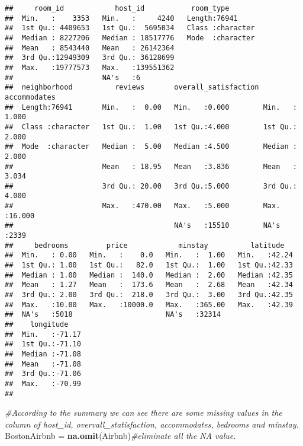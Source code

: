 \documentclass[]{article}
\newenvironment{Shaded}{\begin{snugshade}}{\end{snugshade}}
\newcommand{\KeywordTok}[1]{\textcolor[rgb]{0.13,0.29,0.53}{\textbf{#1}}}
\newcommand{\StringTok}[1]{\textcolor[rgb]{0.31,0.60,0.02}{#1}}
\newcommand{\CommentTok}[1]{\textcolor[rgb]{0.56,0.35,0.01}{\textit{#1}}}
\newcommand{\NormalTok}[1]{#1}
\begin{document}
\begin{verbatim}
##     room_id            host_id           room_type        
##  Min.   :    3353   Min.   :     4240   Length:76941      
##  1st Qu.: 4409653   1st Qu.:  5695034   Class :character  
##  Median : 8227206   Median : 18517776   Mode  :character  
##  Mean   : 8543440   Mean   : 26142364                     
##  3rd Qu.:12949309   3rd Qu.: 36128699                     
##  Max.   :19777573   Max.   :139551362                     
##                     NA's   :6                             
##  neighborhood          reviews       overall_satisfaction  accommodates   
##  Length:76941       Min.   :  0.00   Min.   :0.000        Min.   : 1.000  
##  Class :character   1st Qu.:  1.00   1st Qu.:4.000        1st Qu.: 2.000  
##  Mode  :character   Median :  5.00   Median :4.500        Median : 2.000  
##                     Mean   : 18.95   Mean   :3.836        Mean   : 3.034  
##                     3rd Qu.: 20.00   3rd Qu.:5.000        3rd Qu.: 4.000  
##                     Max.   :470.00   Max.   :5.000        Max.   :16.000  
##                                      NA's   :15510        NA's   :2339    
##     bedrooms         price            minstay          latitude    
##  Min.   : 0.00   Min.   :    0.0   Min.   :  1.00   Min.   :42.24  
##  1st Qu.: 1.00   1st Qu.:   82.0   1st Qu.:  1.00   1st Qu.:42.33  
##  Median : 1.00   Median :  140.0   Median :  2.00   Median :42.35  
##  Mean   : 1.27   Mean   :  173.6   Mean   :  2.68   Mean   :42.34  
##  3rd Qu.: 2.00   3rd Qu.:  218.0   3rd Qu.:  3.00   3rd Qu.:42.35  
##  Max.   :10.00   Max.   :10000.0   Max.   :365.00   Max.   :42.39  
##  NA's   :5018                      NA's   :32314                   
##    longitude     
##  Min.   :-71.17  
##  1st Qu.:-71.10  
##  Median :-71.08  
##  Mean   :-71.08  
##  3rd Qu.:-71.06  
##  Max.   :-70.99  
## 
\end{verbatim}

\begin{Shaded}
\begin{Highlighting}[]
\CommentTok{#According to the summary we can see there are some missing values in the column of host_id, overvall_statisfaction, accommodates, bedrooms and minstay.}
\NormalTok{BostonAirbnb =}\StringTok{ }\KeywordTok{na.omit}\NormalTok{(Airbnb)}\CommentTok{#eliminate all the NA value.}
\end{Highlighting}
\end{Shaded}
\end{document}
